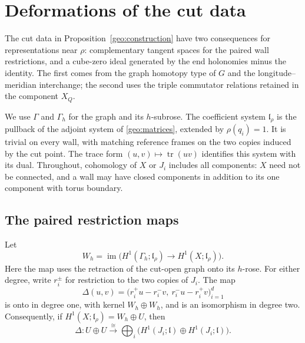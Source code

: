 \section{Deformations of the cut data}
\label{sec:deformation}

The cut data in Proposition~\ref{geo:construction} have two consequences
for representations near $\rho$: complementary tangent spaces for the
paired wall restrictions, and a cube-zero ideal generated by the end
holonomies minus the identity.  The first comes from the graph homotopy
type of $G$ and the longitude--meridian interchange; the second uses the
triple commutator relations retained in the component $X_Q$.

We use $\Gamma$ and $\Gamma_h$ for the graph and its $h$-subrose.
The coefficient system $\mathfrak l_\rho$ is the pullback of the adjoint
system of \eqref{geo:matrices}, extended by $\rho(q_i)=1$.  It is trivial
on every wall, with matching reference frames on the two copies induced
by the cut point.  The trace form
$(u,v)\mapsto\operatorname{tr}(uv)$ identifies this system with its dual.
Throughout, cohomology of $X$ or $J_i$ includes all components: $X$ need
not be connected, and a wall may have closed components in addition to
its one component with torus boundary.

\subsection{The paired restriction maps}

\begin{lemma}
\label{def:paired-mv}
Let
\[
 W_h=\operatorname{im}\bigl(H^1(\Gamma_h;\mathfrak l_\rho)
                 \longrightarrow H^1(X;\mathfrak l_\rho)\bigr).
\]
Here the map uses the retraction of the cut-open graph onto its
\(h\)-rose.  For either degree, write \(r_i^\pm\) for restriction to
the two copies of \(J_i\).  The map
\begin{equation}
 \Delta(u,v)=
  \bigl(r_i^+u-r_i^-v,\ r_i^-u-r_i^+v\bigr)_{i=1}^d
 \label{def:delta}
\end{equation}
is onto in degree one, with kernel \(W_h\oplus W_h\), and is an
isomorphism in degree two.  Consequently, if
\(H^1(X;\mathfrak l_\rho)=W_h\oplus U\), then
\[
 \Delta:U\oplus U\xrightarrow{\ \cong\ }
             \bigoplus_i\bigl(H^1(J_i;\mathfrak l)
                          \oplus H^1(J_i;\mathfrak l)\bigr).
\]
\end{lemma}

